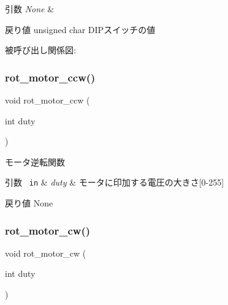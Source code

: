 \begin{DoxyParams}{引数}
{\em None} & \\
\hline
\end{DoxyParams}
\begin{DoxyReturn}{戻り値}
unsigned char D\+I\+Pスイッチの値 
\end{DoxyReturn}
被呼び出し関係図\+:
\mbox{\label{iraira__bo__up__down__mod_8ino_a0a80149a1ef7c2030aba634830be590a}} 
\subsubsection{\texorpdfstring{rot\_motor\_ccw()}{rot\_motor\_ccw()}}
{\footnotesize\ttfamily void rot\+\_\+motor\+\_\+ccw (\begin{DoxyParamCaption}\item[{int}]{duty }\end{DoxyParamCaption})}



モータ逆転関数 


\begin{DoxyParams}[1]{引数}
\mbox{\texttt{ in}}  & {\em duty} & モータに印加する電圧の大きさ\mbox{[}0-\/255\mbox{]} \\
\hline
\end{DoxyParams}
\begin{DoxyReturn}{戻り値}
None 
\end{DoxyReturn}
\mbox{\label{iraira__bo__up__down__mod_8ino_a0c28692fe5e9f44573ec307d7cae2d9b}} 
\subsubsection{\texorpdfstring{rot\_motor\_cw()}{rot\_motor\_cw()}}
{\footnotesize\ttfamily void rot\+\_\+motor\+\_\+cw (\begin{DoxyParamCaption}\item[{int}]{duty }\end{DoxyParamCaption})}



